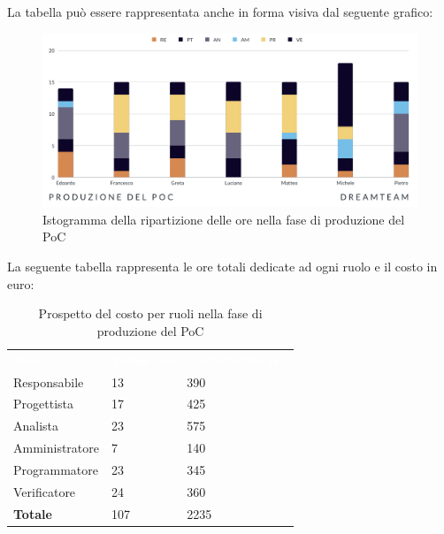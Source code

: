 La tabella può essere rappresentata anche in forma visiva dal seguente grafico:
\begin{figure}[H]
\centering
\includegraphics[scale=0.65]{Sezioni/SezioniPreventivo/grafici/Poc.png}
\caption{Istogramma della ripartizione delle ore nella fase di produzione del PoC}
\end{figure}

La seguente tabella rappresenta le ore totali dedicate ad ogni ruolo e il costo in euro:

\begin{table}[H]
\begin{center}
\renewcommand{\arraystretch}{1.5}
\begin{tabular}{ m{}<{\centering}  m{}<{\centering} m{}<{\centering}}
	\rowcolor{darkblue}
	\textcolor{white}{\textbf{Ruolo}}&\textcolor{white}{\textbf{Totale ore}}&\textcolor{white}{\textbf{Costo totale (\euro)}}\\ 

	Responsabile  & 13 & 390\\	
	
	Progettista & 17 & 425\\
	
	Analista & 23 & 575 \\

	Amministratore & 7 & 140\\
	
	Programmatore & 23 & 345 \\
	
	Verificatore & 24 & 360 \\
	
	\textbf{Totale} & 107 & 2235 \\
	
\end{tabular}
\caption{Prospetto del costo per ruoli nella fase di produzione del PoC}
\end{center}
\end{table}


